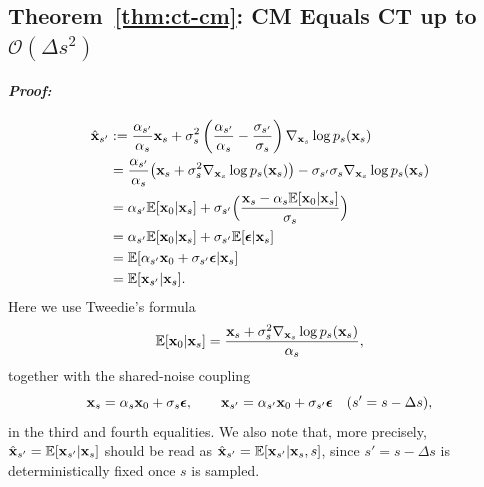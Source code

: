 

\subsection{Theorem~\ref{thm:ct-cm}: CM Equals CT up to $\mathcal{O}(\Delta s^2)$}

\paragraph{\textit{Proof:}} 

\begin{align*}
\hat{{\mathbf{x}}}_{s'}
&:= \frac{\alpha_{s'}}{\alpha_s} {\mathbf{x}}_s 
+ \sigma_s^2 \left(\frac{\alpha_{s'}}{\alpha_s}-\frac{\sigma_{s'}}{\sigma_s}\right)\nabla_{{\mathbf{x}}_s}\log p_s({\mathbf{x}}_s)
\\
&= \frac{\alpha_{s'}}{\alpha_s}\bigl({\mathbf{x}}_s+\sigma_s^2\nabla_{{\mathbf{x}}_s}\log p_s({\mathbf{x}}_s)\bigr)
- \sigma_{s'}\sigma_s \nabla_{{\mathbf{x}}_s}\log p_s({\mathbf{x}}_s)
\\
&= \alpha_{s'} \mathbb{E}[{\mathbf{x}}_0|{\mathbf{x}}_s]
+ \sigma_{s'}\Bigl(\frac{{\mathbf{x}}_s-\alpha_s \mathbb{E}[{\mathbf{x}}_0|{\mathbf{x}}_s]}{\sigma_s}\Bigr)
\\
&= \alpha_{s'} \mathbb{E}[{\mathbf{x}}_0|{\mathbf{x}}_s] + \sigma_{s'} \mathbb{E}[{\bm{\epsilon}}|{\mathbf{x}}_s]
\\
&= \mathbb{E}[\alpha_{s'}{\mathbf{x}}_0+\sigma_{s'}{\bm{\epsilon}}|{\mathbf{x}}_s]
\\
&= \mathbb{E}[{\mathbf{x}}_{s'}|{\mathbf{x}}_s].
\end{align*}
Here we use Tweedie's formula
\[
\mathbb{E}[{\mathbf{x}}_0 |{\mathbf{x}}_s]=\frac{{\mathbf{x}}_s+\sigma_s^2\nabla_{{\mathbf{x}}_s}\log p_s({\mathbf{x}}_s)}{\alpha_s},
\]
together with the shared-noise coupling
\[
{\mathbf{x}}_s=\alpha_s{\mathbf{x}}_0+\sigma_s{\bm{\epsilon}},
\qquad
{\mathbf{x}}_{s'}=\alpha_{s'}{\mathbf{x}}_0+\sigma_{s'}{\bm{\epsilon}}
\quad (s'=s-\Delta s),
\]
in the third and fourth equalities. We also note that, more precisely, $\hat{{\mathbf{x}}}_{s'}=\mathbb{E}[{\mathbf{x}}_{s'}|{\mathbf{x}}_s]$ should be read as
$\hat{{\mathbf{x}}}_{s'}=\mathbb{E}[{\mathbf{x}}_{s'}|{\mathbf{x}}_s, s]$, since $s'=s-\Delta s$ is deterministically fixed once $s$ is sampled.





